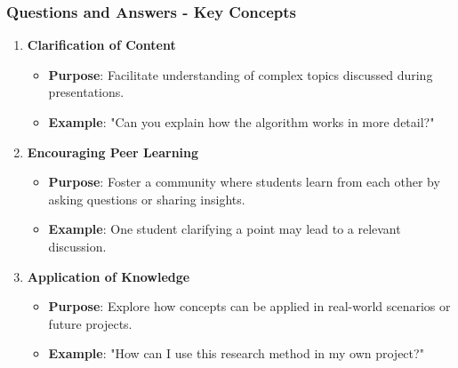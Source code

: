 \documentclass[aspectratio=169]{beamer}
\begin{document}
\begin{frame}[fragile]
    \frametitle{Questions and Answers - Key Concepts}
    \begin{enumerate}
        \item \textbf{Clarification of Content}
            \begin{itemize}
                \item \textbf{Purpose}: Facilitate understanding of complex topics discussed during presentations.
                \item \textbf{Example}: "Can you explain how the algorithm works in more detail?"
            \end{itemize}
        \item \textbf{Encouraging Peer Learning}
            \begin{itemize}
                \item \textbf{Purpose}: Foster a community where students learn from each other by asking questions or sharing insights.
                \item \textbf{Example}: One student clarifying a point may lead to a relevant discussion.
            \end{itemize}
        \item \textbf{Application of Knowledge}
            \begin{itemize}
                \item \textbf{Purpose}: Explore how concepts can be applied in real-world scenarios or future projects.
                \item \textbf{Example}: "How can I use this research method in my own project?"
            \end{itemize}
    \end{enumerate}
\end{frame}
\end{document}
